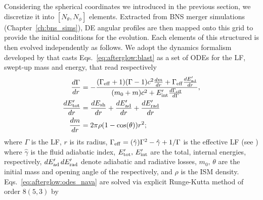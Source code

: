 
\section{\pyblast{}}\label{sec:afterglow:code}

\def\eq{\text{equation}}
\def\eqs{\text{equations}}


Considering the spherical coordinates we introduced in the previous section, 
we discretize it into $[N_{\theta},N_{\phi}]$ elements.
%
Extracted from \ac{BNS} merger simulations (Chapter~\ref{ch:bns_sims}), 
\ac{DE} angular profiles are then mapped onto this grid to provide the 
initial conditions for the evolution. 
%
Each elements of this structured \blast{} is then evolved independently 
as follows. 
%
We adopt the \blast{} dynamics formalism developed by \citet{Nava:2013} that casts 
Eqs.~\eqref{eq:afterglow:blast} as a set of \acp{ODE} for the \blast{} \ac{LF},
swept-up mass and energy, that read respectively 
%
\begin{subequations}
    \label{eq:afterglow:odes_nava}
    \begin{align}
    \frac{d\Gamma}{dr} &= -\frac{(\Gamma_{\rm eff} + 1)(\Gamma - 1) c^2\frac{dm}{dr} + \Gamma_{\rm eff}\frac{dE'_{\rm ad}}{dr}}{(m_0 + m) c^2 + E'_{\rm int}\frac{d\Gamma_{\rm eff}\rm }{d\Gamma}}, \\
    \frac{dE'_{\rm tot}}{dr} &= \frac{dE_{\rm sh}}{dr} + \frac{dE'_{\rm ad}}{dr} + \frac{dE'_{\rm rad}}{dr} \\
    \frac{dm}{dr} &= 2 \pi \rho (1 - \cos(\theta)) r^2;
    \end{align}
\end{subequations}
%
where $\Gamma$ is the \blast{} \ac{LF}, $r$ is its radius, 
$\Gamma_{\rm eff} = (\hat{\gamma})\Gamma^2-\hat{\gamma}+1 / \Gamma$ is the effective 
\ac{LF} (see \citet{Nava:2013}) where $\hat{\gamma}$ is the fluid adiabatic index, 
$E'_{\rm tot},\, E'_{\rm int}$ 
are the total, internal energies, respectively, $dE'_{\rm ad}\, dE'_{\rm rad}$ denote 
adiabatic and radiative losses, $m_0, \, \theta$ are the initial mass and opening angle
of the \blast{} respectively, and $\rho$ is the \ac{ISM} density.
%
Eqs.~\ref{eq:afterglow:odes_nava} are solved via 
explicit Runge-Kutta method of order $8(5,3)$ by \citet{Dormand:1980} 
